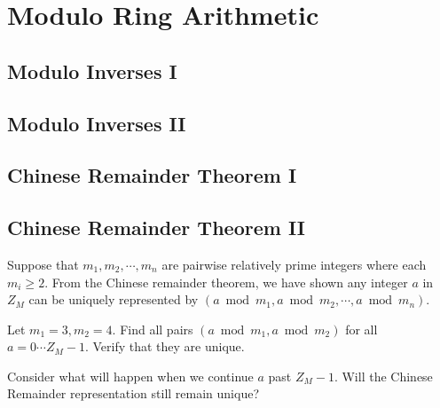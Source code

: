 
\chapter{Modulo Ring Arithmetic}


\section{Modulo Inverses I}



\section{Modulo Inverses II}



\section{Chinese Remainder Theorem I}


\section{Chinese Remainder Theorem II}

Suppose that $m_1, m_2, \cdots, m_n$ are pairwise relatively prime 
integers where each $m_i \geqslant 2$. From the Chinese remainder 
theorem, we have shown any integer $a$ in $Z_M$ can be uniquely 
represented by $(a \bmod m_1, a \bmod m_2, \cdots, a \bmod m_n)$. 


\frmrule

\begin{example}
Let $m_1 = 3, m_2 = 4$. Find all pairs $(a \bmod m_1, a \bmod m_2)$ 
for all $a = 0 \cdots Z_M - 1$. Verify that they are unique.
\end{example}

\begin{example}
Consider what will happen when we continue $a$ past $Z_M - 1$. 
Will the Chinese Remainder representation still remain unique?
\end{example}
